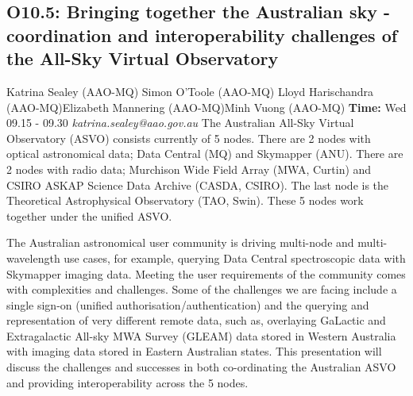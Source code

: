 \documentclass{report}
\begin{document}
\subsection*{O10.5: Bringing together the Australian sky - coordination and interoperability challenges of the All-Sky Virtual Observatory}
\bigskip
Katrina Sealey (AAO-MQ) \newline Simon O'Toole (AAO-MQ) \newline  Lloyd Harischandra (AAO-MQ)\newline  Elizabeth Mannering (AAO-MQ)\newline Minh Vuong (AAO-MQ)\newline  \newline\newline
{\bf Time:} Wed 09.15 - 09.30\newline
\newline
{\it katrina.sealey@aao.gov.au}\newline
\newline\newline
The Australian All-Sky Virtual Observatory (ASVO) consists currently of 5 nodes. There are 2 nodes with optical astronomical data; Data Central (MQ) and Skymapper (ANU). There are 2 nodes with radio data; Murchison Wide Field Array (MWA, Curtin) and CSIRO ASKAP Science Data Archive (CASDA, CSIRO). The last node is the Theoretical Astrophysical Observatory (TAO, Swin). These 5 nodes work together under the unified ASVO. 

The Australian astronomical user community is driving multi-node and multi-wavelength use cases, for example, querying Data Central spectroscopic data with Skymapper imaging data. Meeting the user requirements of the community comes with complexities and challenges. Some of the challenges we are facing include a single sign-on (unified authorisation/authentication) and the querying and representation of very different remote data, such as, overlaying GaLactic and Extragalactic All-sky MWA Survey (GLEAM) data stored in Western Australia with imaging data stored in Eastern Australian states. This presentation will discuss the challenges and successes in both co-ordinating the Australian ASVO and providing interoperability across the 5 nodes.\newline
\newpage
\end{document}
